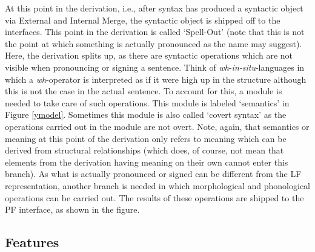 At this point in the derivation, i.e., after syntax has produced a syntactic object via External and Internal Merge, the syntactic object is shipped off to the interfaces. This point in the derivation is called `Spell-Out' (note that this is not the point at which something is actually pronounced as the name may suggest). Here, the derivation splits up, as there are syntactic operations which are not visible when pronouncing or signing a sentence. Think of \textit{wh}-\textit{in-situ}-languages in which a \textit{wh}-operator is interpreted as if it were high up in the structure although this is not the case in the actual sentence. To account for this, a module is needed to take care of such operations. This module is labeled `semantics' in Figure \ref{ymodel}. Sometimes this module is also called `covert syntax' as the operations carried out in the module are not overt. Note, again, that semantics or meaning at this point of the derivation only refers to meaning which can be derived from structural relationships (which does, of course, not mean that elements from the derivation having meaning on their own cannot enter this branch). As what is actually pronounced or signed can be different from the LF representation, another branch is needed in which morphological and phonological operations can be carried out. The results of these operations are shipped to the PF interface, as shown in the figure.

\subsection{Features}

